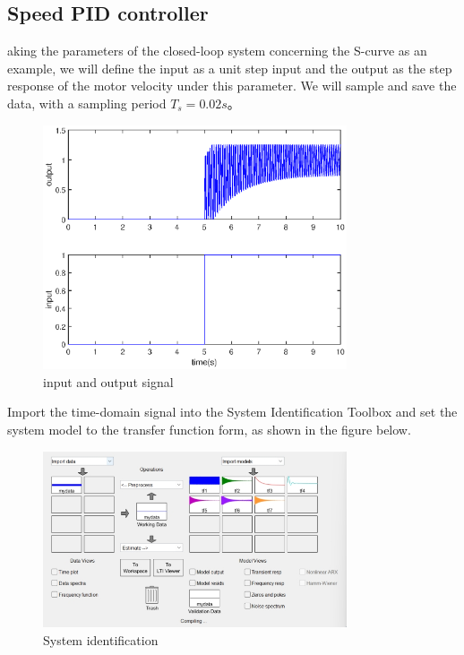 \documentclass[11pt,a4paper]{article}%
\begin{document}
\subsection{Speed PID controller}
aking the parameters of the closed-loop system concerning the S-curve as an example, we will define the input as a unit step input and the output as the step response of the motor velocity under this parameter. We will sample and save the data, with a sampling period $T_s=0.02s$。
\begin{figure}[H]
    \centering
    \includegraphics[width=0.8\textwidth]{inoutput}
    \caption{input and output signal}
    \label{inoutput}
\end{figure}
Import the time-domain signal into the System Identification Toolbox and set the system model to the transfer function form, as shown in the figure below.
\begin{figure}[H]
    \centering
    \includegraphics[width=0.8\textwidth]{tf}
    \caption{System identification}
    \label{model}
\end{figure}
\end{document}
